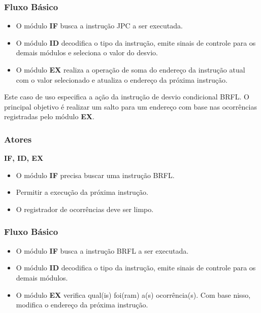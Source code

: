 \subsubsection*{Fluxo Básico}
\begin{itemize}
\item O módulo \textbf{IF} busca a instrução JPC a ser executada.
\item O módulo \textbf{ID} decodifica o tipo da instrução, emite sinais de controle para os demais módulos e seleciona o valor do desvio.
\item O módulo \textbf{EX} realiza a operação de soma do endereço da instrução atual com o valor selecionado e atualiza o endereço da próxima instrução.
\end{itemize}


Este caso de uso especifica a ação da instrução de desvio condicional BRFL. O principal objetivo é realizar um salto para um endereço com base nas ocorrências registradas pelo módulo \textbf{EX}.
 
\subsubsection*{Atores}
\textbf{IF, ID, EX}

\preconditions 
\begin{itemize}
 \item O módulo \textbf{IF} precisa buscar uma instrução BRFL.
\end{itemize}

\postconditions
\begin{itemize}
  \item Permitir a execução da próxima instrução.
  \item O registrador de ocorrências deve ser limpo.
\end{itemize}

\subsubsection*{Fluxo Básico}
\begin{itemize}
\item O módulo \textbf{IF} busca a instrução BRFL a ser executada.
\item O módulo \textbf{ID} decodifica o tipo da instrução, emite sinais de controle para os demais módulos.
\item O módulo \textbf{EX} verifica qual(is) foi(ram) a(s) ocorrência(s). Com base nisso, modifica o endereço da próxima instrução.
\end{itemize}

